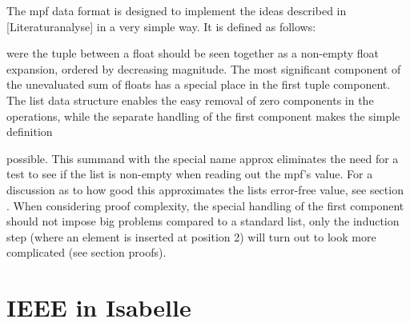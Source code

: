 \documentclass[11pt,a4paper]{article}
\begin{document}
\floatdef

The mpf data format is designed to implement the ideas described in [Literaturanalyse] in a very simple way. It is defined as follows:


were the tuple between a float should be seen together as a non-empty float expansion, ordered by decreasing magnitude. The most significant component of the unevaluated sum of floats has a special place in the first tuple component. The list data structure enables the easy removal of zero components in the operations, while the separate handling of the first component makes the simple definition


possible. This summand with the special name approx
eliminates the need for a test to see if the list is non-empty when reading out the mpf's value. For a discussion as to how good this approximates the lists error-free value, see section     . When considering proof complexity, the special handling of the first component should not impose big problems compared to a standard list, only the induction step (where an element is inserted at position 2) will turn out to look more complicated (see section proofs).

\section{IEEE in Isabelle}
\end{document}
